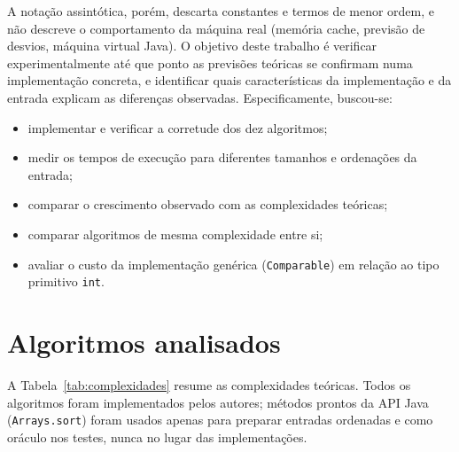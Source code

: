 \documentclass[11pt,a4paper]{article}
\begin{document}
A notação assintótica, porém, descarta constantes e termos de menor ordem, e não descreve o
comportamento da máquina real (memória cache, previsão de desvios, máquina virtual Java). O objetivo
deste trabalho é verificar experimentalmente até que ponto as previsões teóricas se confirmam
numa implementação concreta, e identificar quais características da implementação e da entrada
explicam as diferenças observadas. Especificamente, buscou-se:
\begin{itemize}
  \item implementar e verificar a corretude dos dez algoritmos;
  \item medir os tempos de execução para diferentes tamanhos e ordenações da entrada;
  \item comparar o crescimento observado com as complexidades teóricas;
  \item comparar algoritmos de mesma complexidade entre si;
  \item avaliar o custo da implementação genérica (\texttt{Comparable}) em relação ao tipo primitivo \texttt{int}.
\end{itemize}

\section{Algoritmos analisados}

A Tabela~\ref{tab:complexidades} resume as complexidades teóricas. Todos os algoritmos foram
implementados pelos autores; métodos prontos da API Java (\texttt{Arrays.sort}) foram usados apenas
para preparar entradas ordenadas e como oráculo nos testes, nunca no lugar das implementações.
\end{document}
